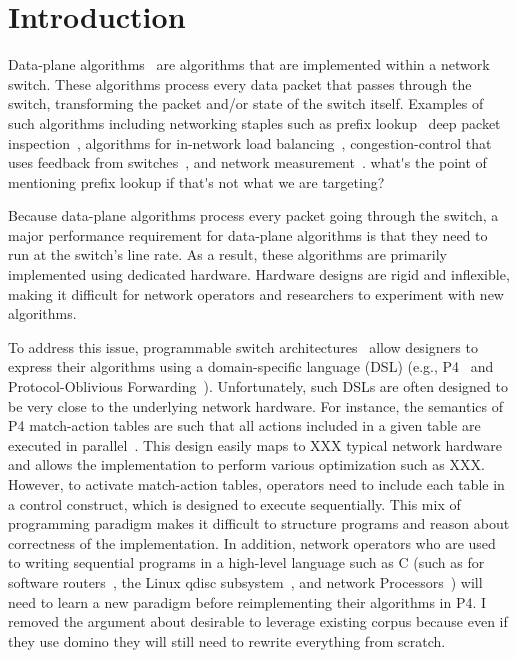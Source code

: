\section{Introduction}
\label{s:intro}

Data-plane algorithms~\cite{cestan} are algorithms that are implemented within
a network switch. These algorithms process every data packet that passes
through the switch, transforming the packet and/or state of the switch itself.
Examples of such algorithms including networking staples such as prefix
lookup~\cite{lookup} deep packet inspection~\cite{bro_ids}, algorithms for
in-network load balancing~\cite{conga, ecmp}, congestion-control that uses
feedback from switches~\cite{xcp, rcp, pdq, dctcp}, and network
measurement~\cite{minsketch, heavy_hitters}.
\ac{what's the point of mentioning prefix lookup if that's not what we are targeting?}

Because data-plane algorithms process every packet going through the switch, a
major performance requirement for data-plane algorithms is that they need to run
at the switch's line rate. As a result, these algorithms are primarily
implemented using dedicated hardware. Hardware designs are rigid and
inflexible, making it difficult for network operators and researchers to
experiment with new algorithms.

To address this issue,
programmable switch architectures~\cite{flexpipe, xpliant, rmt} allow
designers to express their algorithms using a domain-specific language (DSL)
(e.g., P4~\cite{p4} and Protocol-Oblivious Forwarding~\cite{pof}).
Unfortunately, such DSLs are often designed to be very close 
to the underlying network hardware. For instance, the semantics of P4 match-action 
tables
are such that all actions included in a given table are executed in parallel~\cite{p4Spec}.
This design easily maps to XXX typical network hardware and allows the implementation
to perform various optimization such as XXX.
However, to activate match-action tables, operators need to include each table in a
control construct, which is designed to execute sequentially.
This mix of programming paradigm makes it difficult to structure programs
and reason about correctness of the implementation. In addition, network operators
who are used to writing sequential programs in a high-level language such as C
(such as for software routers~\cite{click},
the Linux qdisc subsystem~\cite{qdisc}, and network Processors~\cite{npu}) will need
to learn a new paradigm before reimplementing their algorithms in P4.
\ac{I removed the argument about desirable to leverage existing corpus because
even if they use domino they will still need to rewrite everything from scratch.}

